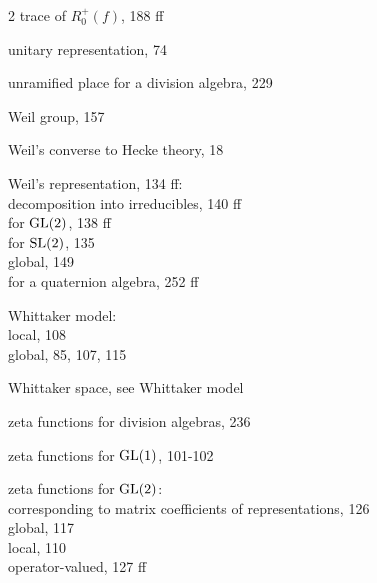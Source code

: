 \begin{multicols}{2}
\noindent trace of $R_0^{+}(f)$, 188 ff\par
\noindent unitary representation, 74\par
\noindent unramified place for a division algebra, 229\par
\noindent Weil group, 157\par
\noindent Weil's converse to Hecke theory, 18\par
\noindent Weil's representation, 134 ff:\\
\hspace*{1em}decomposition into irreducibles, 140 ff\\
\hspace*{1em}for $\operatorname{GL}(2)$, 138 ff\\
\hspace*{1em}for $\operatorname{SL}(2)$, 135\\
\hspace*{1em}global, 149\\
\hspace*{1em}for a quaternion algebra, 252 ff\par
\noindent Whittaker model:\\
\hspace*{1em}local, 108\\
\hspace*{1em}global, 85, 107, 115\par
\noindent Whittaker space, see Whittaker model\par
\noindent zeta functions for division algebras, 236\par
\noindent zeta functions for $\operatorname{GL}(1)$, 101-102\par
\noindent zeta functions for $\operatorname{GL}(2)$:\\
\hspace*{1em}corresponding to matrix coefficients of representations, 126\\
\hspace*{1em}global, 117\\
\hspace*{1em}local, 110\\
\hspace*{1em}operator-valued, 127 ff\par
\end{multicols}
